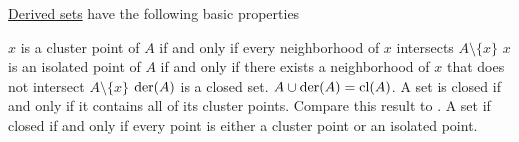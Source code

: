 \begin{proposition}\label{thm:derived_set_properties}
  \hyperref[def:topological_derived_set]{Derived sets} have the following basic properties
  \begin{PropEnum}
     \( x \) is a cluster point of \( A \) if and only if every neighborhood of \( x \) intersects \( A \setminus \{ x \} \)
     \( x \) is an isolated point of \( A \) if and only if there exists a neighborhood of \( x \) that does not intersect \( A \setminus \{ x \} \)
     \( \operatorname{der}(A) \) is a closed set.
     \( A \cup \operatorname{der}(A) = \operatorname{cl}(A) \).
     A set is closed if and only if it contains all of its cluster points. Compare this result to .
     A set if closed if and only if every point is either a cluster point or an isolated point.
  \end{PropEnum}
\end{proposition}
